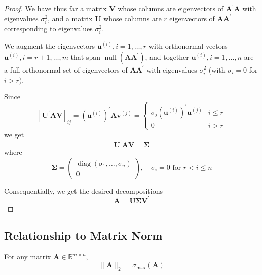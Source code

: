 \begin{proof}
	We have thus far a matrix $\mathbf{V}$ whose columns are eigenvectors of $\mathbf{A}^{\prime}\mathbf{A}$ with eigenvalues $\sigma_{i}^{2}$, and a matrix $\mathbf{U}$ whose columns are $r$ eigenvectors of $\mathbf{A}\mathbf{A}^{\prime}$ corresponding to eigenvalues $\sigma_{i}^{2}$.

	We augment the eigenvectors $\boldsymbol{u}^{(i)},i=1,\ldots,r$ with orthonormal vectors $\boldsymbol{u}^{(i)},i=r+1,\ldots,m$ that span $\operatorname{null}\left(\mathbf{A}\mathbf{A}^{\prime}\right)$, and together $\boldsymbol{u}^{(i)},i=1,\ldots,n$ are a full orthonormal set of eigenvectors of $\mathbf{A}\mathbf{A}^{\prime}$ with eigenvalues $\sigma_{i}^{2}$ (with $\sigma_{i}=0$ for $i>r)$.

	Since
	\begin{equation*}
		\left[\mathbf{U}^{\prime}\mathbf{A}\mathbf{V}\right]_{ij}=\left(\boldsymbol{u}^{(i)}\right)^{\prime}\mathbf{A}\boldsymbol{v}^{(j)}=\begin{cases}\sigma_{j}\left(\boldsymbol{u}^{(i)}\right)^{\prime}\boldsymbol{u}^{(j)} & i \leq r \\ 0 & i>r\end{cases}
	\end{equation*}
	we get
	\begin{equation*}
		\mathbf{U}^{\prime}\mathbf{A}\mathbf{V}=\boldsymbol{\Sigma}
	\end{equation*}
	where
	\begin{equation*}
		\boldsymbol{\Sigma}=\begin{pmatrix}
			\operatorname{diag}\left(\sigma_{1},\ldots,\sigma_{n}\right) \\
			\mathbf{0}
		\end{pmatrix}
		,\quad\sigma_{i}=0\text { for } r<i\leq n
	\end{equation*}

	Consequentially, we get the desired decompositions
	\begin{equation*}
		\mathbf{A}=\mathbf{U}\boldsymbol{\Sigma}\mathbf{V}^{\prime}
	\end{equation*}
\end{proof}

\subsection{Relationship to Matrix Norm}

\begin{theorem}
	For any matrix $\mathbf{A}\in\mathbb{R}^{m\times n}$,
	\begin{equation}
		\|\mathbf{A}\|_{2}=\sigma_{\max}(\mathbf{A})
	\end{equation}
\end{theorem}

